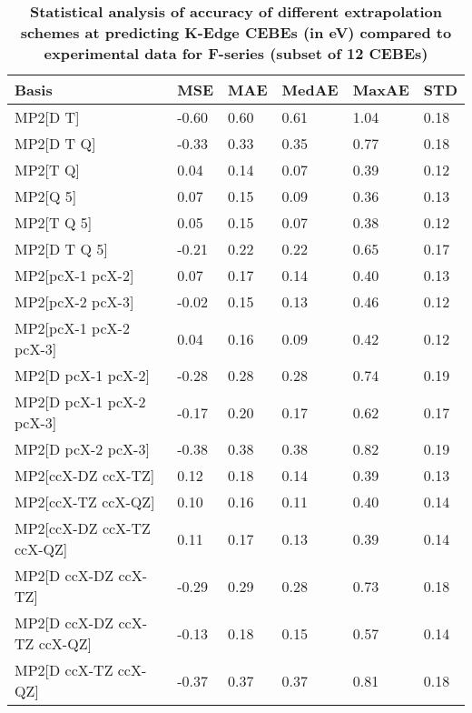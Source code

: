 \begin{table}
  \caption{\textbf{Statistical analysis of accuracy of different extrapolation schemes at predicting K-Edge CEBEs (in eV) compared to experimental data for F-series (subset of 12 CEBEs)}}
  \begin{tabular}{l l l l l l }
    \toprule
    \textbf{Basis} & \textbf{MSE} & \textbf{MAE} & \textbf{MedAE} & \textbf{MaxAE} & \textbf{STD} \\ 
    \midrule
    MP2[D T] & -0.60 & 0.60 & 0.61 & 1.04 & 0.18 \\ 
    MP2[D T Q] & -0.33 & 0.33 & 0.35 & 0.77 & 0.18 \\ 
    MP2[T Q] & 0.04 & 0.14 & 0.07 & 0.39 & 0.12 \\ 
    MP2[Q 5] & 0.07 & 0.15 & 0.09 & 0.36 & 0.13 \\ 
    MP2[T Q 5] & 0.05 & 0.15 & 0.07 & 0.38 & 0.12 \\ 
    MP2[D T Q 5] & -0.21 & 0.22 & 0.22 & 0.65 & 0.17 \\ 
    MP2[pcX-1 pcX-2] & 0.07 & 0.17 & 0.14 & 0.40 & 0.13 \\ 
    MP2[pcX-2 pcX-3] & -0.02 & 0.15 & 0.13 & 0.46 & 0.12 \\ 
    MP2[pcX-1 pcX-2 pcX-3] & 0.04 & 0.16 & 0.09 & 0.42 & 0.12 \\ 
    MP2[D pcX-1 pcX-2] & -0.28 & 0.28 & 0.28 & 0.74 & 0.19 \\ 
    MP2[D pcX-1 pcX-2 pcX-3] & -0.17 & 0.20 & 0.17 & 0.62 & 0.17 \\ 
    MP2[D pcX-2 pcX-3] & -0.38 & 0.38 & 0.38 & 0.82 & 0.19 \\ 
    MP2[ccX-DZ ccX-TZ] & 0.12 & 0.18 & 0.14 & 0.39 & 0.13 \\ 
    MP2[ccX-TZ ccX-QZ] & 0.10 & 0.16 & 0.11 & 0.40 & 0.14 \\ 
    MP2[ccX-DZ ccX-TZ ccX-QZ] & 0.11 & 0.17 & 0.13 & 0.39 & 0.14 \\ 
    MP2[D ccX-DZ ccX-TZ] & -0.29 & 0.29 & 0.28 & 0.73 & 0.18 \\ 
    MP2[D ccX-DZ ccX-TZ ccX-QZ] & -0.13 & 0.18 & 0.15 & 0.57 & 0.14 \\ 
    MP2[D ccX-TZ ccX-QZ] & -0.37 & 0.37 & 0.37 & 0.81 & 0.18 \\ 
    \bottomrule
  \end{tabular}
\end{table}
